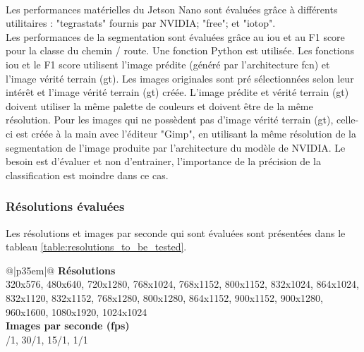 \vspace{0.5\baselineskip}
\\
\noindent Les performances matérielles du Jetson Nano sont évaluées grâce à différents utilitaires : "tegrastats" fournis par NVIDIA; "free"; et "iotop".
\vspace{0.5\baselineskip}
\\
\noindent Les performances de la segmentation sont évaluées grâce au \acrshort{iou} et au F1 score pour la classe du chemin / route. Une fonction Python est utilisée. Les fonctions \acrshort{iou} et le F1 score utilisent l'image prédite (généré par l'architecture \acrshort{fcn}) et l'image vérité terrain (\acrshort{gt}). Les images originales sont pré sélectionnées selon leur intérêt et l'image vérité terrain (\acrshort{gt}) créée. L'image prédite et vérité terrain (\acrshort{gt}) doivent utiliser la même palette de couleurs et doivent être de la même résolution. Pour les images qui ne possèdent pas d'image vérité terrain (\acrshort{gt}), celle-ci est créée à la main avec l'éditeur "Gimp", en utilisant la même résolution de la segmentation de l'image produite par l'architecture du modèle de NVIDIA. Le besoin est d'évaluer et non d'entrainer, l'importance de la précision de la classification est moindre dans ce cas. 
\subsubsection{Résolutions évaluées}\label{section:resolutions_to_be_tested}
Les résolutions et images par seconde qui sont évaluées sont présentées dans le tableau \ref{table:resolutions_to_be_tested}.
{
    \renewcommand*{\arraystretch}{1.4}
    \begin{table}[ht]
    \centering
    \caption{Résolutions et images par seconde (\acrshort{fps}) qui sont évaluées}\label{table:resolutions_to_be_tested}
    \vspace{0.1em} %
    \begin{tabular}{{@{}|p{35em}|@{}}}
         \hline
         \textbf{Résolutions}\\
         \hline
        320x576, 480x640, 720x1280, 768x1024, 768x1152, 800x1152, 832x1024, 864x1024, 832x1120, 832x1152, 768x1280, 800x1280, 864x1152, 900x1152, 900x1280, 960x1600, 1080x1920, 1024x1024\\
        \hline
        \textbf{Images par seconde (\acrshort{fps}) }\\
        /1, 30/1, 15/1, 1/1\\
        \hline
    \end{tabular}
    \end{table}
}